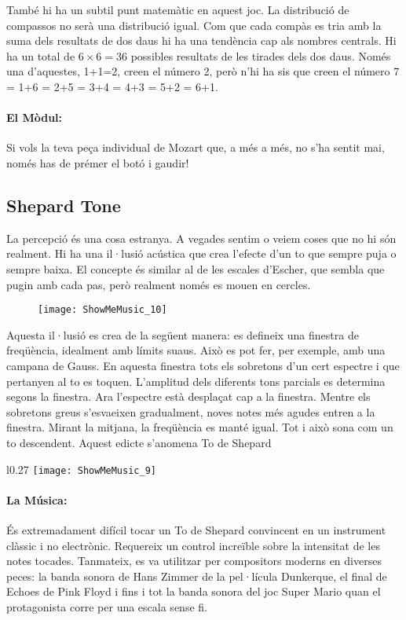 També hi ha un subtil punt matemàtic en aquest joc. La distribució de compassos no serà una distribució igual. Com que cada compàs es tria amb la suma dels resultats de dos daus hi ha una tendència cap als nombres centrals. Hi ha un total de $6\times 6=36$ possibles resultats de les tirades dels dos daus. Només una d'aquestes, 1+1=2, creen el número 2, però n'hi ha sis que creen el número 7 = 1+6 = 2+5 = 3+4 = 4+3 = 5+2 = 6+1.  

\paragraph{El Mòdul:} Si vols la teva peça individual de Mozart que, a més a més, no s'ha sentit mai, només has de prémer el botó i gaudir!

\subsection{Shepard Tone}
La percepció és una cosa estranya. A vegades sentim o veiem coses que no hi són realment. Hi ha una il·lusió acústica que crea l'efecte d'un to que sempre puja o sempre baixa. El concepte és similar al de les escales d'Escher, que sembla que pugin amb cada pas, però realment només es mouen en cercles. 

\begin{figure}[h]
\centering
\texttt{[image: ShowMeMusic\_10]}
\end{figure}
Aquesta il·lusió es crea de la següent manera: es defineix una finestra de freqüència, idealment amb límits suaus. Això es pot fer, per exemple, amb una campana de Gauss. En aquesta finestra tots els sobretons d'un cert espectre i que pertanyen al to es toquen. L'amplitud dels diferents tons parcials es determina segons la finestra. Ara l'espectre està desplaçat cap a la finestra. Mentre els sobretons greus s'esvaeixen gradualment, noves notes més agudes entren a la finestra. Mirant la mitjana, la freqüència es manté igual. Tot i això sona com un to descendent. Aquest edicte s'anomena To de Shepard


\begin{wrapfigure}[30]{l}{0.27\textwidth}
\centering
\texttt{[image: ShowMeMusic\_9]}
\end{wrapfigure}
\paragraph{La Música:} És extremadament difícil tocar un To de Shepard convincent en un instrument clàssic i no electrònic. Requereix un control increïble sobre la intensitat de les notes tocades. Tanmateix, es va utilitzar per compositors moderns en diverses peces: la banda sonora de Hans Zimmer de la pel·lícula Dunkerque, el final de Echoes de Pink Floyd i fins i tot la banda sonora del joc Super Mario quan el protagonista corre per una escala sense fi.

